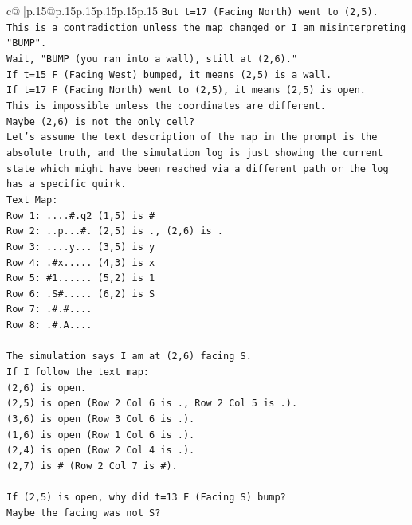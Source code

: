 \documentclass{article}
\begin{document}
{\begin{supertabular}{c@{$\;$}|p{.15\linewidth}@{}p{.15\linewidth}p{.15\linewidth}p{.15\linewidth}p{.15\linewidth}p{.15\linewidth}}
{{{\texttt{But t=17 (Facing North) went to (2,5).} \\
\texttt{This is a contradiction unless the map changed or I am misinterpreting "BUMP".} \\
\texttt{Wait, "BUMP (you ran into a wall), still at (2,6)."} \\
\texttt{If t=15 F (Facing West) bumped, it means (2,5) is a wall.} \\
\texttt{If t=17 F (Facing North) went to (2,5), it means (2,5) is open.} \\
\texttt{This is impossible unless the coordinates are different.} \\
\texttt{Maybe (2,6) is not the only cell?} \\
\texttt{Let's assume the text description of the map in the prompt is the absolute truth, and the simulation log is just showing the current state which might have been reached via a different path or the log has a specific quirk.} \\
\texttt{Text Map:} \\
\texttt{Row 1: ....\#.q2 (1,5) is \#} \\
\texttt{Row 2: ..p...\#. (2,5) is ., (2,6) is .} \\
\texttt{Row 3: ....y... (3,5) is y} \\
\texttt{Row 4: .\#x..... (4,3) is x} \\
\texttt{Row 5: \#1...... (5,2) is 1} \\
\texttt{Row 6: .S\#..... (6,2) is S} \\
\texttt{Row 7: .\#.\#....} \\
\texttt{Row 8: .\#.A....} \\
\\ 
\texttt{The simulation says I am at (2,6) facing S.} \\
\texttt{If I follow the text map:} \\
\texttt{(2,6) is open.} \\
\texttt{(2,5) is open (Row 2 Col 6 is ., Row 2 Col 5 is .).} \\
\texttt{(3,6) is open (Row 3 Col 6 is .).} \\
\texttt{(1,6) is open (Row 1 Col 6 is .).} \\
\texttt{(2,4) is open (Row 2 Col 4 is .).} \\
\texttt{(2,7) is \# (Row 2 Col 7 is \#).} \\
\\ 
\texttt{If (2,5) is open, why did t=13 F (Facing S) bump?} \\
\texttt{Maybe the facing was not S?} \\
}}}
\end{supertabular}}
\end{document}
